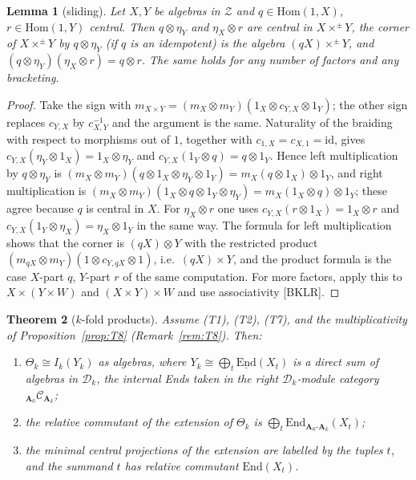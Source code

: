 \documentclass[11pt]{article}
\newtheorem{theorem}{Theorem}[section]
\newtheorem{lemma}[theorem]{Lemma}
\theoremstyle{definition}
\theoremstyle{remark}
\begin{document}
\begin{lemma}[sliding]\label{lem:slide}
Let $X,Y$ be algebras in $\mathcal Z$ and $q\in\mathrm{Hom}(1,X)$, $r\in\mathrm{Hom}(1,Y)$ central. Then $q\otimes\eta_Y$ and $\eta_X\otimes r$ are central in $X\times^\pm Y$, the corner of $X\times^\pm Y$ by $q\otimes\eta_Y$ (if $q$ is an idempotent) is the algebra $(qX)\times^\pm Y$, and $(q\otimes\eta_Y)(\eta_X\otimes r)=q\otimes r$. The same holds for any number of factors and any bracketing.
\end{lemma}
\begin{proof}
Take the sign with $m_{X\times Y}=(m_X\otimes m_Y)(1_X\otimes c_{Y,X}\otimes1_Y)$; the other sign replaces $c_{Y,X}$ by $c_{X,Y}^{-1}$ and the argument is the same. Naturality of the braiding with respect to morphisms out of $1$, together with $c_{1,X}=c_{X,1}=\mathrm{id}$, gives $c_{Y,X}(\eta_Y\otimes1_X)=1_X\otimes\eta_Y$ and $c_{Y,X}(1_Y\otimes q)=q\otimes1_Y$. Hence left multiplication by $q\otimes\eta_Y$ is $(m_X\otimes m_Y)(q\otimes1_X\otimes\eta_Y\otimes1_Y)=m_X(q\otimes1_X)\otimes1_Y$, and right multiplication is $(m_X\otimes m_Y)(1_X\otimes q\otimes1_Y\otimes\eta_Y)=m_X(1_X\otimes q)\otimes1_Y$; these agree because $q$ is central in $X$. For $\eta_X\otimes r$ one uses $c_{Y,X}(r\otimes1_X)=1_X\otimes r$ and $c_{Y,X}(1_Y\otimes\eta_X)=\eta_X\otimes1_Y$ in the same way. The formula for left multiplication shows that the corner is $(qX)\otimes Y$ with the restricted product $(m_{qX}\otimes m_Y)(1\otimes c_{Y,qX}\otimes1)$, i.e.\ $(qX)\times Y$, and the product formula is the case $X$-part $q$, $Y$-part $r$ of the same computation. For more factors, apply this to $X\times(Y\times W)$ and $(X\times Y)\times W$ and use associativity [BKLR].
\end{proof}
\begin{theorem}[$k$-fold products]\label{thm:kfold}
Assume (T1), (T2), (T7), and the multiplicativity of Proposition~\ref{prop:T8} (Remark~\ref{rem:T8}). Then:
\begin{enumerate}[nosep,label=(\alph*)]
\item $\Theta_k\cong I_k(Y_k)$ as algebras, where $Y_k\cong\bigoplus_t\underline{\mathrm{End}}(X_t)$ is a direct sum of algebras in $\mathcal D_k$, the internal Ends taken in the right $\mathcal D_k$-module category ${}_{\mathbf A_0}\mathcal C_{\mathbf A_k}$;
\item the relative commutant of the extension of $\Theta_k$ is $\bigoplus_t\mathrm{End}_{\mathbf A_0\text{-}\mathbf A_k}(X_t)$;
\item the minimal central projections of the extension are labelled by the tuples $t$, and the summand $t$ has relative commutant $\mathrm{End}(X_t)$.
\end{enumerate}
\end{theorem}
\end{document}

